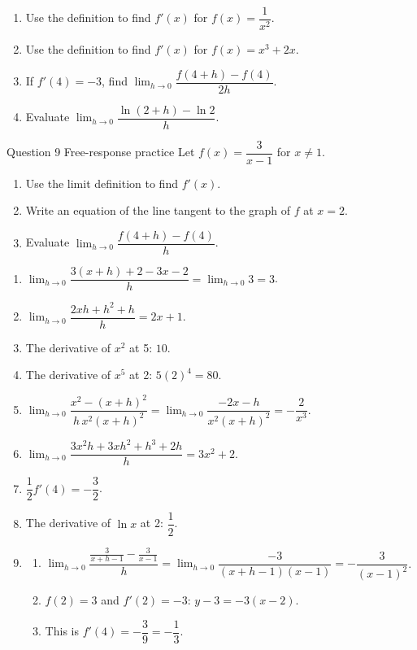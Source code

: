 \documentclass[11pt]{article}
\begin{document}
\begin{enumerate}[leftmargin=*,itemsep=2pt,start=5]
  \item Use the definition to find $f'(x)$ for $f(x)=\dfrac{1}{x^2}$.\work{2.8cm}
  \item Use the definition to find $f'(x)$ for $f(x)=x^3+2x$.\work{2.8cm}
  \item If $f'(4)=-3$, find $\displaystyle\lim_{h\to 0}\dfrac{f(4+h)-f(4)}{2h}$.\work{2.8cm}
  \item Evaluate $\displaystyle\lim_{h\to 0}\dfrac{\ln(2+h)-\ln2}{h}$.\work{2.8cm}
\end{enumerate}

\begin{frbox}{Question 9 \textperiodcentered{} Free-response practice}
Let $f(x)=\dfrac{3}{x-1}$ for $x\neq1$.
\begin{enumerate}[label=(\alph*),leftmargin=*,itemsep=2pt]
  \item Use the limit definition to find $f'(x)$.\work{2.6cm}
  \item Write an equation of the line tangent to the graph of $f$ at $x=2$.\work{2.6cm}
  \item Evaluate $\displaystyle\lim_{h\to 0}\dfrac{f(4+h)-f(4)}{h}$.\work{2.6cm}
\end{enumerate}
\end{frbox}

\newpage
\begin{solbox}
\begin{enumerate}[leftmargin=*,itemsep=4pt]
  \item $\displaystyle\lim_{h\to 0}\dfrac{3(x+h)+2-3x-2}{h}=\displaystyle\lim_{h\to 0}3=3$.
  \item $\displaystyle\lim_{h\to 0}\dfrac{2xh+h^2+h}{h}=2x+1$.
  \item The derivative of $x^2$ at 5: $10$.
  \item The derivative of $x^5$ at 2: $5(2)^4=80$.
  \item $\displaystyle\lim_{h\to 0}\dfrac{x^2-(x+h)^2}{h\,x^2(x+h)^2}=\displaystyle\lim_{h\to 0}\dfrac{-2x-h}{x^2(x+h)^2}=-\dfrac{2}{x^3}$.
  \item $\displaystyle\lim_{h\to 0}\dfrac{3x^2h+3xh^2+h^3+2h}{h}=3x^2+2$.
  \item $\dfrac12f'(4)=-\dfrac32$.
  \item The derivative of $\ln x$ at 2: $\dfrac12$.
  \item \begin{enumerate}[label=(\alph*),leftmargin=*,itemsep=3pt]
    \item $\displaystyle\lim_{h\to 0}\dfrac{\frac{3}{x+h-1}-\frac{3}{x-1}}{h}=\displaystyle\lim_{h\to 0}\dfrac{-3}{(x+h-1)(x-1)}=-\dfrac{3}{(x-1)^2}$.
    \item $f(2)=3$ and $f'(2)=-3$: $y-3=-3(x-2)$.
    \item This is $f'(4)=-\dfrac{3}{9}=-\dfrac13$.
  \end{enumerate}
\end{enumerate}
\end{solbox}
\end{document}
